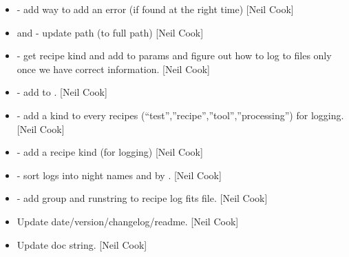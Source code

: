 \documentclass[a4paper,10pt,english]{report}
\begin{document}
\begin{itemize}
\item {} 
 - add way to add an error (if found at the right
time) {[}Neil Cook{]}

\item {} 
 and  - update
 path (to full path) {[}Neil Cook{]}

\item {} 
 - get recipe kind and add to params and
figure out how to log to files only once we have correct information.
{[}Neil Cook{]}

\item {} 
 - add  to . {[}Neil Cook{]}

\item {} 
 - add a kind to every recipes
(“test”,”recipe”,”tool”,”processing”) for logging. {[}Neil Cook{]}

\item {} 
 - add a recipe kind (for logging) {[}Neil Cook{]}

\item {} 
 - sort logs into night names and by .
{[}Neil Cook{]}

\item {} 
 - add group and runstring to recipe log fits
file. {[}Neil Cook{]}

\item {} 
Update date/version/changelog/readme. {[}Neil Cook{]}

\item {} 
Update doc string. {[}Neil Cook{]}

\end{itemize}
\end{document}
